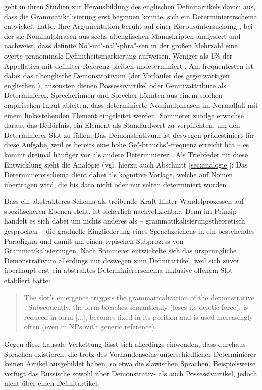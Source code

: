 \textcite{Sommerer2012,Sommerer2015} geht in ihren Studien zur Herausbildung des englischen Definitartikels davon aus, dass die Grammatikalisierung erst beginnen konnte,  sich ein Determiniererschema entwickelt hatte. Ihre Argumentation beruht auf einer  Korpusuntersuchung \parencite[vgl.][197--198]{Sommerer2012}, bei der sie Nominalphrasen aus sechs altenglischen Manuskripten analysiert und nachweist, dass definite No"-mi"-nal"-phra"-sen in der großen Mehrzahl eine overte pränominale Definitheitsmarkierung aufweisen. Weniger als 1\% der Appellativa mit definiter Referenz bleiben undeterminiert \parencite[122]{Sommerer2015}. Am frequentesten ist dabei das altenglische Demonstrativum  (der Vorläufer des gegenwärtigen englischen ), ansonsten dienen Possessivartikel oder Genitivattribute als Determinierer. Sprecherinnen und Sprecher könnten aus einem solchen empirischen Input ableiten, dass determinierte Nominalphrasen im Normalfall mit einem linksstehenden Element eingeleitet werden. Sommerer zufolge erwachse daraus das Bedürfnis, ein Element als Standardwert zu verpflichten, um den Determinierer-Slot zu füllen. Das Demonstrativum  ist deswegen prädestiniert für diese Aufgabe, weil es bereits eine hohe Ge"-brauchs"-frequenz erreicht hat -- es kommt dreimal häufiger vor als andere Determinierer \parencite[125]{Sommerer2015}. Als Triebfeder für diese Entwicklung sieht \citeauthor{Sommerer2015} die Analogie (vgl. hierzu auch Abschnitt \ref{sec:analogie}): Das Determiniererschema dient dabei als kognitive Vorlage, welche auf Nomen übertragen wird, die bis dato nicht oder nur selten determiniert wurden \parencite[125]{Sommerer2015}. 

Dass ein abstrakteres Schema als treibende Kraft hinter Wandelprozessen auf spezifischeren Ebenen steht, ist sicherlich nachvollziehbar. 
Denn im Prinzip handelt es sich dabei um nichts anderes als -- grammatikalisierungstheoretisch gesprochen -- die graduelle Eingliederung eines Sprachzeichens in ein bestehendes Paradigma und damit um einen typischen Subprozess von Grammatikalisierungen. Nach Sommerer entwickelte sich das ursprüngliche Demonstrativum allerdings nur deswegen zum Definitartikel, weil sich zuvor überhaupt erst ein abstraktes Determiniererschema inklusive offenem Slot etabliert hatte: \blockcquote[205]{Sommerer2012}{The slot’s emergence triggers the grammaticalization of the demonstrative . Subsequently, the form bleaches semantically (loses its deictic force), is reduced in form [...], becomes fixed in its position and is used increasingly often (even
in NPs with generic reference).} Gegen diese kausale Verkettung lässt sich allerdings einwenden, dass durchaus Sprachen existieren, die trotz des Vorhandenseins unterschiedlicher Determinierer keinen Artikel ausgebildet haben, so etwa die slawischen Sprachen. Beispielsweise verfügt das Russische sowohl über Demonstrativ- als auch Possessivartikel, jedoch nicht über einen Definitartikel. 
 

